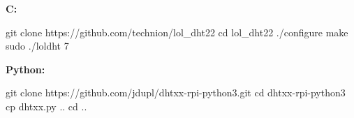 \textbf{C:}

\begin{console}
git clone https://github.com/technion/lol_dht22
cd lol_dht22
./configure
make
sudo ./loldht 7
\end{console}

\textbf{Python:}
\begin{console}
git clone https://github.com/jdupl/dhtxx-rpi-python3.git
cd dhtxx-rpi-python3
cp dhtxx.py ..
cd ..
\end{console}

\lstset{language=Python, caption=, 
        label=DHT22Program, frame=single, basicstyle=\ttfamily
	      \footnotesize, breakatwhitespace=false, showstringspaces=false, 
        showtabs=false, tabsize=2 }

